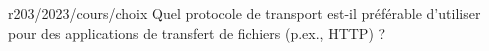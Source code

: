 \begin{question}{r203/2023/cours/choix}
  Quel protocole de transport est-il préférable d'utiliser pour des
  applications de transfert de fichiers (p.ex., HTTP) ?
  \begin{reponses}
  \end{reponses}
\end{question}
